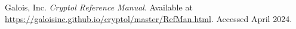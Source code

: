 \begin{thebibliography}{9}
	Galois, Inc.
	\newblock \textit{Cryptol Reference Manual}.
	\newblock Available at \url{https://galoisinc.github.io/cryptol/master/RefMan.html}.
	\newblock Accessed April 2024.
\end{thebibliography} 